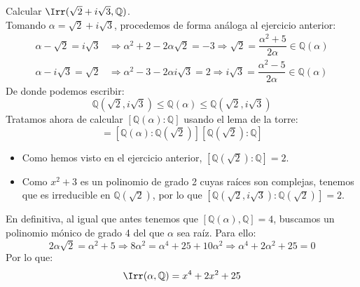 \begin{ejercicio}
    Calcular $\Irr(\sqrt{2}+i\sqrt{3},\mathbb{Q})$.\\

    \noindent
    Tomando $\alpha = \sqrt{2}+i\sqrt{3}$, procedemos de forma análoga al ejercicio anterior:
    \begin{align*}
        \alpha-\sqrt{2} = i\sqrt{3} &\Longrightarrow \alpha^2 + 2 - 2\alpha\sqrt{2} = -3 \Longrightarrow \sqrt{2} = \dfrac{\alpha^2+5}{2\alpha} \in \mathbb{Q}(\alpha)\\
        \alpha-i\sqrt{3} = \sqrt{2} &\Longrightarrow \alpha^2 -3 -2\alpha i \sqrt{3} = 2 \Longrightarrow i\sqrt{3} = \dfrac{\alpha^2-5}{2\alpha} \in \mathbb{Q}(\alpha)
    \end{align*}
    De donde podemos escribir:
    \begin{equation*}
        \mathbb{Q}(\sqrt{2},i\sqrt{3}) \leq \mathbb{Q}(\alpha) \leq \mathbb{Q}(\sqrt{2},i\sqrt{3})
    \end{equation*}
    Tratamos ahora de calcular $[\mathbb{Q}(\alpha):\mathbb{Q}]$ usando el lema de la torre:
    \begin{equation*}
        [\mathbb{Q}(\alpha):\mathbb{Q}] = [\mathbb{Q}(\alpha):\mathbb{Q}(\sqrt{2})][\mathbb{Q}(\sqrt{2}):\mathbb{Q}]
    \end{equation*}
    \begin{itemize}
        \item Como hemos visto en el ejercicio anterior, $[\mathbb{Q}(\sqrt{2}):\mathbb{Q}]=2$.
        \item Como $x^2+3$ es un polinomio de grado 2 cuyas raíces son complejas, tenemos que es irreducible en $\mathbb{Q}(\sqrt{2})$, por lo que $[\mathbb{Q}(\sqrt{2},i\sqrt{3}):\mathbb{Q}(\sqrt{2})] = 2$.
    \end{itemize}
    En definitiva, al igual que antes tenemos que $[\mathbb{Q}(\alpha),\mathbb{Q}] = 4$, buscamos un polinomio mónico de grado 4 del que $\alpha$ sea raíz. Para ello:
    \begin{equation*}
        2\alpha\sqrt{2} = \alpha^2 + 5 \Longrightarrow 8\alpha^2 = \alpha^4 + 25 + 10\alpha^2 \Longrightarrow \alpha^4 + 2\alpha^2 + 25 = 0
    \end{equation*}
    Por lo que:
    \begin{equation*}
        \Irr(\alpha,\mathbb{Q}) = x^4+2x^2+25
    \end{equation*}
\end{ejercicio}

